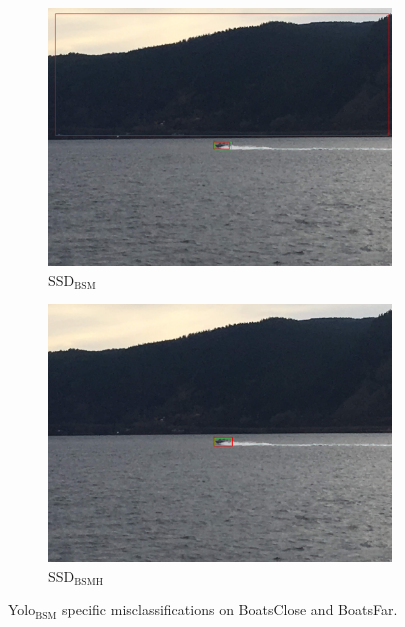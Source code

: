\begin{figure}[h!]
\begin{subfigure}{.5\textwidth}
  \centering
  \includegraphics[width=0.75\linewidth]{results/case_buildings/ssdtrf/ssd2/grov2/IMG_2325.jpg}
  \caption{SSD$_{\text{BSM}}$}
\end{subfigure}%
\begin{subfigure}{.5\textwidth}
  \centering
  \includegraphics[width=.75\linewidth]{results/case_buildings/ssdtrf/ssd3/grov2/IMG_2325.jpg}
  \caption{SSD$_{\text{BSMH}}$}
\end{subfigure}
\caption{Yolo$_{\text{BSM}}$ specific misclassifications on BoatsClose and BoatsFar.}
\label{img:yolo2_misclas}


\end{figure}
